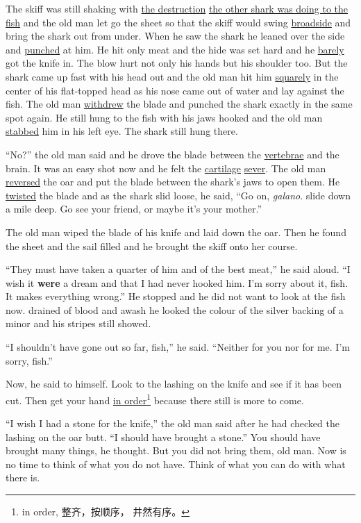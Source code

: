 \documentclass[fontset=ubuntu]{ctexrep}
\begin{document}
The skiff was still shaking with \uline{the destruction} \uline{the other shark
  was doing to the fish} and the old man let go the sheet so that the skiff
would swing \uline{broadside} and bring the shark out from under. When he saw
the shark he leaned over the side and \uline{punched} at him. He hit only meat
and the hide was set hard and he \uline{barely} got the knife in. The blow hurt
not only his hands but his shoulder too. But the shark came up fast with his
head out and the old man hit him \uline{squarely} in the center of his
flat-topped head as his nose came out of water and lay against the fish. The
old man \uline{withdrew} the blade and punched the shark exactly in the same
spot again. He still hung to the fish with his jaws hooked and the old man
\uline{stabbed} him in his left eye. The shark still hung there.

``No?'' the old man said and he drove the blade between the \uline{vertebrae}
and the brain. It was an easy shot now and he felt the \uline{cartilage}
\uline{sever}. The old man \uline{reversed} the oar and put the blade between the
shark's jaws to open them. He \uline{twisted} the blade and as the shark slid
loose, he said, ``Go on, \emph{galano}. \Gls{slide} down a mile deep. Go see your friend,
or maybe it's your mother.''

The old man wiped the blade of his knife and laid down the oar. Then he
found the sheet and the sail filled and he brought the skiff onto her
course.

``They must have taken a quarter of him and of the best meat,'' he said
aloud. ``I wish it \textbf{were} a dream and that I had never hooked him.
I'm sorry about it, fish. It makes everything wrong.'' He stopped and he did
not want to look at the fish now. \Gls{drained} of blood and \gls{awash} he
looked the colour of the silver backing of a minor and his stripes still
showed.

``I shouldn't have gone out so far, fish,'' he said. ``Neither for you nor
for me. I'm sorry, fish.''

Now, he said to himself. Look to the lashing on the knife and see if it has
been cut. Then get your hand \uline{in order}\footnote{in order, 整齐，按顺序，
  井然有序。} because there still is more to come.

``I wish I had a stone for the knife,'' the old man said after he had
checked the lashing on the oar butt. ``I should have brought a stone.'' You
should have brought many things, he thought. But you did not bring them, old
man. Now is no time to think of what you do not have. Think of what you can
do with what there is.
\end{document}
